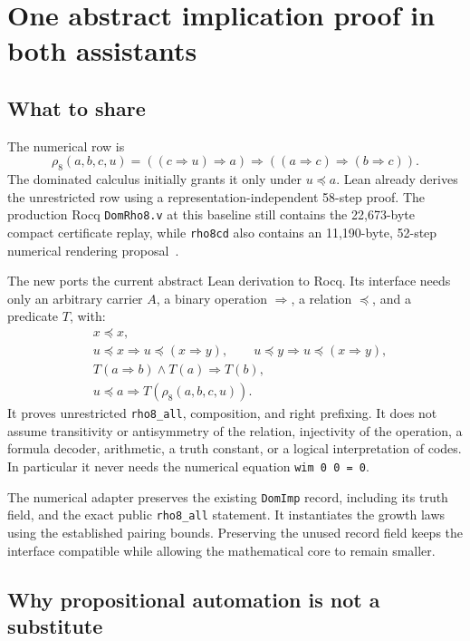 \documentclass[11pt,letterpaper]{article}
\newcommand{\code}[1]{\texttt{\small #1}}
\newcommand{\Rho}{\rho_8}
\begin{document}
\section{One abstract implication proof in both assistants}

\subsection{What to share}

The numerical row is
\[
 \Rho(a,b,c,u)=((c\Rightarrow u)\Rightarrow a)
       \Rightarrow((a\Rightarrow c)\Rightarrow(b\Rightarrow c)).
\]
The dominated calculus initially grants it only under \(u\preccurlyeq a\).
Lean already derives the unrestricted row using a representation-independent
58-step proof. The production Rocq \code{DomRho8.v} at this baseline still contains
the 22,673-byte compact certificate replay, while \code{rho8cd} also contains an
11,190-byte, 52-step numerical rendering proposal~\cite{rho8,rocqproduction}.

The new  ports the current abstract Lean derivation
to Rocq. Its interface needs only an arbitrary carrier \(A\), a binary operation
\(\Rightarrow\), a relation \(\preccurlyeq\), and a predicate \(T\), with:
\begin{align*}
 &x\preccurlyeq x,\\
 &u\preccurlyeq x\Longrightarrow u\preccurlyeq(x\Rightarrow y),\qquad
 u\preccurlyeq y\Longrightarrow u\preccurlyeq(x\Rightarrow y),\\
 &T(a\Rightarrow b)\land T(a)\Longrightarrow T(b),\\
 &u\preccurlyeq a\Longrightarrow T(\Rho(a,b,c,u)).
\end{align*}
It proves unrestricted \code{rho8\_all}, composition, and right prefixing. It does
not assume transitivity or antisymmetry of the relation, injectivity of the operation,
a formula decoder, arithmetic, a truth constant, or a logical interpretation of codes.
In particular it never needs the numerical equation \code{wim 0 0 = 0}.

The numerical adapter preserves the existing \code{DomImp} record, including its
truth field, and the exact public \code{rho8\_all} statement. It instantiates the
growth laws using the established pairing bounds. Preserving the unused record field
keeps the interface compatible while allowing the mathematical core to remain smaller.

\subsection{Why propositional automation is not a substitute}
\end{document}
